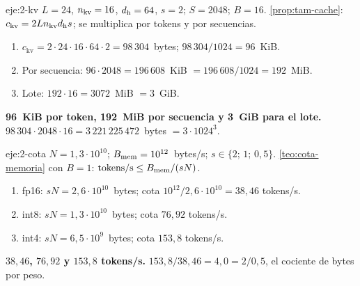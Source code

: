 \begin{solucion}{eje:2-kv}
\datos $L=24$, $n_{\mathrm{kv}}=16$, $d_{\mathrm{h}}=64$, $s=2$; $S=2048$; $B=16$.
\planteamiento \cref{prop:tam-cache}: $c_{\mathrm{kv}}=2Ln_{\mathrm{kv}}d_{\mathrm{h}} s$; se multiplica por tokens y por secuencias.
\pasos
\begin{enumerate}[label=\arabic*.]
  \item $c_{\mathrm{kv}}=2\cdot 24\cdot 16\cdot 64\cdot 2=98\,304$~bytes; $98\,304/1024=96$~KiB.
  \item Por secuencia: $96\cdot 2048=196\,608$~KiB $=196\,608/1024=192$~MiB.
  \item Lote: $192\cdot 16=3072$~MiB $=3$~GiB.
\end{enumerate}
\resultado \textbf{96~KiB por token, 192~MiB por secuencia y 3~GiB para el lote.}
\comprobacion $98\,304\cdot 2048\cdot 16=3\,221\,225\,472$~bytes $=3\cdot 1024^{3}$.
\end{solucion}

\begin{solucion}{eje:2-cota}
\datos $N=1{,}3\cdot 10^{10}$; $B_{\mathrm{mem}}=10^{12}$~bytes/s; $s\in\{2;\allowbreak\,1;\allowbreak\,0{,}5\}$.
\planteamiento \cref{teo:cota-memoria} con $B=1$: $\text{tokens/s}\le B_{\mathrm{mem}}/(sN)$.
\pasos
\begin{enumerate}[label=\arabic*.]
  \item fp16: $sN=2{,}6\cdot 10^{10}$~bytes; cota $10^{12}/2{,}6\cdot 10^{10}=38{,}46$ tokens/s.
  \item int8: $sN=1{,}3\cdot 10^{10}$~bytes; cota $76{,}92$ tokens/s.
  \item int4: $sN=6{,}5\cdot 10^{9}$~bytes; cota $153{,}8$ tokens/s.
\end{enumerate}
\resultado \textbf{$38{,}46$, $76{,}92$ y $153{,}8$ tokens/s.}
\comprobacion $153{,}8/38{,}46=4{,}0=2/0{,}5$, el cociente de bytes por peso.
\end{solucion}

